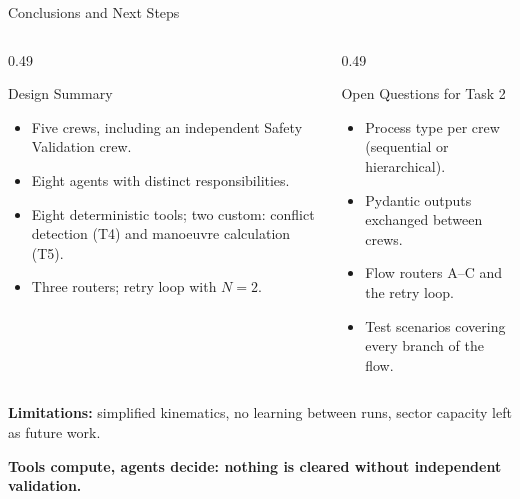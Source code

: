 

\begin{frame}{Conclusions and Next Steps}

\begin{columns}[T,onlytextwidth]

\begin{column}{0.49\textwidth}
\begin{block}{Design Summary}
\small
\begin{itemize}
    \item Five crews, including an independent Safety Validation crew.
    \item Eight agents with distinct responsibilities.
    \item Eight deterministic tools; two custom: conflict detection (T4) and manoeuvre calculation (T5).
    \item Three routers; retry loop with $N = 2$.
\end{itemize}
\end{block}
\end{column}

\begin{column}{0.49\textwidth}
\begin{block}{Open Questions for Task 2}
\small
\begin{itemize}
    \item Process type per crew (sequential or hierarchical).
    \item Pydantic outputs exchanged between crews.
    \item Flow routers A--C and the retry loop.
    \item Test scenarios covering every branch of the flow.
\end{itemize}
\end{block}
\end{column}

\end{columns}

\vspace{0.2cm}

{\footnotesize
\textbf{Limitations:} simplified kinematics, no learning between runs,
sector capacity left as future work.
}

\vspace{0.3cm}

\centering
\textbf{Tools compute, agents decide: nothing is cleared without independent validation.}

\end{frame}
